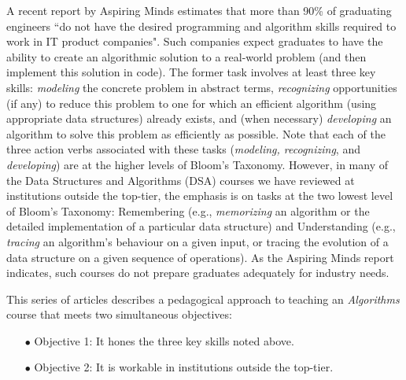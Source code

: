 \begin{multicols}{2}
A recent report by Aspiring Minds \cite{art3-key01} estimates that more than 90\% of graduating engineers ``do not have the desired programming and algorithm skills required to work in IT product companies". Such companies expect graduates to have the ability to create an algorithmic solution to a real-world problem (and then implement this solution in code). The former task involves at least three key skills: \textit{modeling} the concrete problem in abstract terms, \textit{recognizing} opportunities (if any) to reduce this problem to one for which an efficient algorithm (using appropriate data structures) already exists, and (when necessary) \textit{developing} an algorithm to solve this problem as efficiently as possible. Note that each of the three action verbs associated with these tasks (\textit{modeling, recognizing}, and \textit{developing}) are at the higher levels of Bloom's Taxonomy. However, in many of the Data Structures and Algorithms (DSA) courses we have reviewed at institutions outside the top-tier, the emphasis is on tasks at the two lowest level of Bloom's Taxonomy: Remembering (e.g., \textit{memorizing} an algorithm or the detailed implementation of a particular data structure) and Understanding (e.g., \textit{tracing} an algorithm's behaviour on a given input, or tracing the evolution of a data structure on a given sequence of operations). As the Aspiring Minds report \cite{art3-key01} indicates, such courses do not prepare graduates adequately for industry needs.

This series of articles describes a pedagogical approach to teaching an \textit{Algorithms} course that meets two simultaneous objectives:

\vspace{-.2cm}

\begin{itemize}  
\item[$\bullet$] Objective 1: It hones the three key skills noted above.\\[-.4cm]
\item[$\bullet$] Objective 2: It is workable in institutions outside the top-tier.\\[-.4cm]
\end{itemize}
  
\vspace{-.2cm}  
  

\end{multicols}
